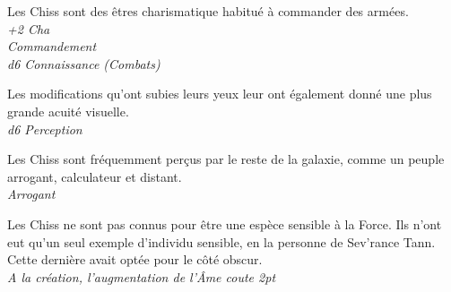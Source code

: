 \begin{description}[align=left]
\item [Charismatique] 			%
		Les Chiss sont des êtres charismatique habitué à commander des armées.\\
		\emph{+2 Cha}\\
		\emph{Commandement}\\
		\emph{d6 Connaissance (Combats)}
\item [Aquité visuelle] 		%
		Les modifications qu’ont subies leurs yeux leur ont également donné une plus grande acuité visuelle.\\
		\emph{d6 Perception}
\item [Arrogant] 				%
		Les Chiss sont fréquemment perçus par le reste de la galaxie, comme un peuple arrogant, calculateur et distant.\\
		\emph{Arrogant}
\item [Insensible à la Force] 		%
		Les Chiss ne sont pas connus pour être une espèce sensible à la Force. Ils n’ont eut qu’un seul exemple d’individu sensible, en la personne de Sev’rance Tann. Cette dernière avait optée pour le côté obscur.\\
		\emph{A la création, l'augmentation de l'\^Ame coute 2pt}
\end{description}